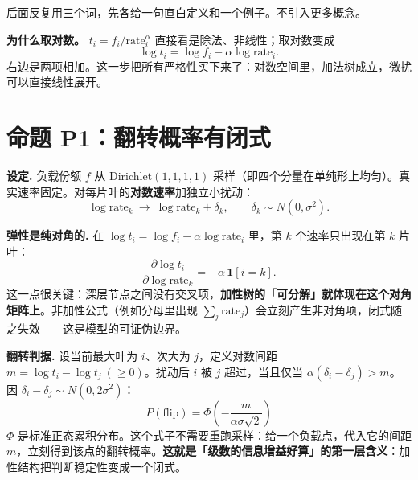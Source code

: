 \documentclass[12pt]{ctexart}
\newcommand{\rate}{\mathrm{rate}}
\newcommand{\flip}{\mathrm{flip}}
\begin{document}
后面反复用三个词，先各给一句直白定义和一个例子。不引入更多概念。

\begin{table}[htbp]
\centering\small
{}
\end{table}

\textbf{为什么取对数。} $t_i=f_i/\rate_i^{\alpha}$ 直接看是除法、非线性；取对数变成
\[
\log t_i=\log f_i-\alpha\log\rate_i .
\]
右边是两项相加。这一步把所有严格性买下来了：对数空间里，加法树成立，微扰可以直接线性展开。

\section{命题 P1：翻转概率有闭式}

\textbf{设定.} 负载份额 $f$ 从 Dirichlet$(1,1,1,1)$ 采样（即四个分量在单纯形上均匀）。真实速率固定。对每片叶的\textbf{对数速率}加独立小扰动：
\[
\log\rate_k\ \to\ \log\rate_k+\delta_k,\qquad \delta_k\sim N(0,\sigma^2).
\]

\textbf{弹性是纯对角的.} 在 $\log t_i=\log f_i-\alpha\log\rate_i$ 里，第 $k$ 个速率只出现在第 $k$ 片叶：
\[
\frac{\partial\log t_i}{\partial\log\rate_k}=-\alpha\,\mathbf{1}[i=k].
\]
这一点很关键：深层节点之间没有交叉项，\textbf{加性树的「可分解」就体现在这个对角矩阵上}。非加性公式（例如分母里出现 $\sum_j\rate_j$）会立刻产生非对角项，闭式随之失效——这是模型的可证伪边界。

\textbf{翻转判据.} 设当前最大叶为 $i$、次大为 $j$，定义对数间距 $m=\log t_i-\log t_j\ (\ge 0)$。扰动后 $i$ 被 $j$ 超过，当且仅当 $\alpha(\delta_i-\delta_j)>m$。因 $\delta_i-\delta_j\sim N(0,2\sigma^2)$：
\[
\boxed{P(\flip)=\Phi\!\left(-\frac{m}{\alpha\sigma\sqrt2}\right)}
\]
$\Phi$ 是标准正态累积分布。这个式子不需要重跑采样：给一个负载点，代入它的间距 $m$，立刻得到该点的翻转概率。\textbf{这就是「级数的信息增益好算」的第一层含义}：加性结构把判断稳定性变成一个闭式。
\end{document}
